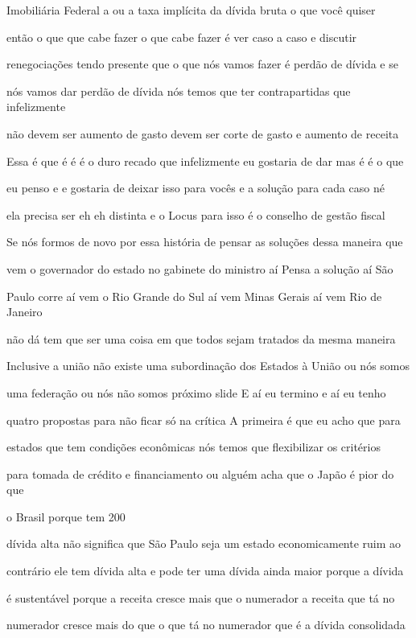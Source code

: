 \documentclass[a4paper,12pt]{article}
\begin{document}
Imobiliária Federal a ou a taxa implícita da dívida bruta o que você quiser

então o que que cabe fazer o que cabe fazer é ver caso a caso e discutir

renegociações tendo presente que o que nós vamos fazer é perdão de dívida e se

nós vamos dar perdão de dívida nós temos que ter contrapartidas que infelizmente

não devem ser aumento de gasto devem ser corte de gasto e aumento de receita

Essa é que é é é o duro recado que infelizmente eu gostaria de dar mas é é o que

eu penso e e gostaria de deixar isso para vocês e a solução para cada caso né

ela precisa ser eh eh distinta e o Locus para isso é o conselho de gestão fiscal

Se nós formos de novo por essa história de pensar as soluções dessa maneira que

vem o governador do estado no gabinete do ministro aí Pensa a solução aí São

Paulo corre aí vem o Rio Grande do Sul aí vem Minas Gerais aí vem Rio de Janeiro

não dá tem que ser uma coisa em que todos sejam tratados da mesma maneira

Inclusive a união não existe uma subordinação dos Estados à União ou nós somos

uma federação ou nós não somos próximo slide E aí eu termino e aí eu tenho

quatro propostas para não ficar só na crítica A primeira é que eu acho que para

estados que tem condições econômicas nós temos que flexibilizar os critérios

para tomada de crédito e financiamento ou alguém acha que o Japão é pior do que

o Brasil porque tem 200%

dívida alta não significa que São Paulo seja um estado economicamente ruim ao

contrário ele tem dívida alta e pode ter uma dívida ainda maior porque a dívida

é sustentável porque a receita cresce mais que o numerador a receita que tá no

numerador cresce mais do que o que tá no numerador que é a dívida consolidada
\end{document}
